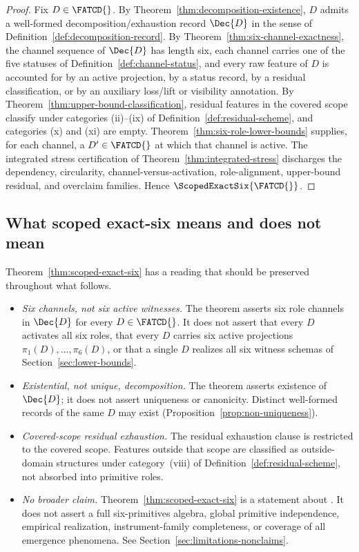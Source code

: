 \begin{proof}
Fix \(D \in \FATCD{}\). By Theorem~\ref{thm:decomposition-existence},
\(D\) admits a well-formed decomposition/exhaustion record \(\Dec{D}\)
in the sense of Definition~\ref{def:decomposition-record}. By
Theorem~\ref{thm:six-channel-exactness}, the channel sequence of
\(\Dec{D}\) has length six, each channel carries one of the five
statuses of Definition~\ref{def:channel-status}, and every raw
feature of \(D\) is accounted for by an active projection, by a
status record, by a residual classification, or by an auxiliary
loss/lift or visibility annotation. By
Theorem~\ref{thm:upper-bound-classification}, residual features in
the covered scope classify under categories (ii)--(ix) of
Definition~\ref{def:residual-scheme}, and categories (x) and (xi) are
empty. Theorem~\ref{thm:six-role-lower-bounds} supplies, for each
channel, a \(D' \in \FATCD{}\) at which that channel is active. The
integrated stress certification of
Theorem~\ref{thm:integrated-stress} discharges the dependency,
circularity, channel-versus-activation, role-alignment, upper-bound
residual, and overclaim families. Hence \(\ScopedExactSix{\FATCD{}}\).
\end{proof}

\subsection{What scoped exact-six means and does not mean}\label{subsec:exact-six-meaning}

Theorem~\ref{thm:scoped-exact-six} has a reading that should be
preserved throughout what follows.

\begin{itemize}[topsep=2pt,itemsep=1pt]
  \item \emph{Six channels, not six active witnesses.} The theorem
    asserts six role channels in \(\Dec{D}\) for every
    \(D \in \FATCD{}\). It does not assert that every \(D\) activates
    all six roles, that every \(D\) carries six active projections
    \(\pi_1(D), \ldots, \pi_6(D)\), or that a single \(D\) realizes
    all six witness schemas of Section~\ref{sec:lower-bounds}.
  \item \emph{Existential, not unique, decomposition.} The theorem
    asserts existence of \(\Dec{D}\); it does not assert uniqueness or
    canonicity. Distinct well-formed records of the same \(D\) may
    exist (Proposition~\ref{prop:non-uniqueness}).
  \item \emph{Covered-scope residual exhaustion.} The residual
    exhaustion clause is restricted to the covered scope. Features
    outside that scope are classified as outside-domain structures
    under category~(viii) of Definition~\ref{def:residual-scheme},
    not absorbed into primitive roles.
  \item \emph{No broader claim.} Theorem~\ref{thm:scoped-exact-six}
    is a statement about \FATCD{}. It does not assert a full
    six-primitives algebra, global primitive independence, empirical
    realization, instrument-family completeness, or coverage of all
    emergence phenomena. See Section~\ref{sec:limitations-nonclaims}.
\end{itemize}

